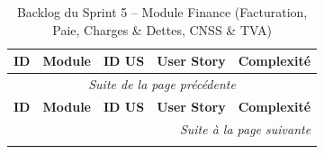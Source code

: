 
\begin{longtable}{|c|c|c|p{7.2cm}|c|}
\caption{Backlog du Sprint 5 -- Module Finance (Facturation, Paie, Charges \& Dettes, CNSS \& TVA)} \label{tab:backlog-sprint-5} \\
\hline
\textbf{ID} & \textbf{Module} & \textbf{ID US} & \textbf{User Story} & \textbf{Complexité} \\
\hline
\endfirsthead

\multicolumn{5}{c}{\textit{Suite de la page précédente}} \\
\hline
\textbf{ID} & \textbf{Module} & \textbf{ID US} & \textbf{User Story} & \textbf{Complexité} \\
\hline
\endhead

\hline \multicolumn{5}{r}{\textit{Suite à la page suivante}} \\
\endfoot

\hline
\endlastfoot


\end{longtable}
